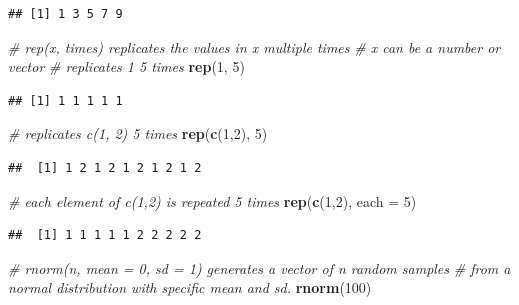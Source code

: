 \documentclass[]{book}
\newenvironment{Shaded}{\begin{snugshade}}{\end{snugshade}}
\newcommand{\KeywordTok}[1]{\textcolor[rgb]{0.13,0.29,0.53}{\textbf{{#1}}}}
\newcommand{\DataTypeTok}[1]{\textcolor[rgb]{0.13,0.29,0.53}{{#1}}}
\newcommand{\DecValTok}[1]{\textcolor[rgb]{0.00,0.00,0.81}{{#1}}}
\newcommand{\CommentTok}[1]{\textcolor[rgb]{0.56,0.35,0.01}{\textit{{#1}}}}
\newcommand{\NormalTok}[1]{{#1}}
\begin{document}
\begin{verbatim}
## [1] 1 3 5 7 9
\end{verbatim}

\begin{Shaded}
\begin{Highlighting}[]
\CommentTok{# rep(x, times) replicates the values in x multiple times}
\CommentTok{# x can be a number or vector}
\CommentTok{# replicates 1 5 times}
\KeywordTok{rep}\NormalTok{(}\DecValTok{1}\NormalTok{, }\DecValTok{5}\NormalTok{)}
\end{Highlighting}
\end{Shaded}

\begin{verbatim}
## [1] 1 1 1 1 1
\end{verbatim}

\begin{Shaded}
\begin{Highlighting}[]
\CommentTok{# replicates c(1, 2) 5 times}
\KeywordTok{rep}\NormalTok{(}\KeywordTok{c}\NormalTok{(}\DecValTok{1}\NormalTok{,}\DecValTok{2}\NormalTok{), }\DecValTok{5}\NormalTok{)}
\end{Highlighting}
\end{Shaded}

\begin{verbatim}
##  [1] 1 2 1 2 1 2 1 2 1 2
\end{verbatim}

\begin{Shaded}
\begin{Highlighting}[]
\CommentTok{# each element of c(1,2) is repeated 5 times}
\KeywordTok{rep}\NormalTok{(}\KeywordTok{c}\NormalTok{(}\DecValTok{1}\NormalTok{,}\DecValTok{2}\NormalTok{), }\DataTypeTok{each =} \DecValTok{5}\NormalTok{)}
\end{Highlighting}
\end{Shaded}

\begin{verbatim}
##  [1] 1 1 1 1 1 2 2 2 2 2
\end{verbatim}

\begin{Shaded}
\begin{Highlighting}[]
\CommentTok{# rnorm(n, mean = 0, sd = 1) generates a vector of n random samples }
\CommentTok{# from a normal distribution with specific mean and sd. }
\KeywordTok{rnorm}\NormalTok{(}\DecValTok{100}\NormalTok{)}
\end{Highlighting}
\end{Shaded}
\end{document}
